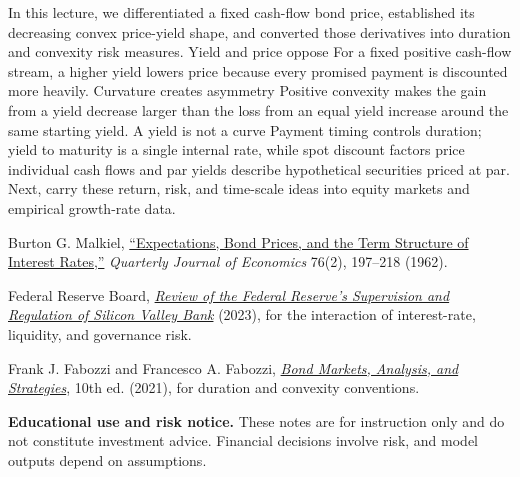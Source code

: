 \documentclass[11pt]{article}
\begin{document}
\keytakeaways
  {In this lecture, we differentiated a fixed cash-flow bond price, established its decreasing convex price-yield shape, and converted those derivatives into duration and convexity risk measures.}
  {Yield and price oppose}
  {For a fixed positive cash-flow stream, a higher yield lowers price because every promised payment is discounted more heavily.}
  {Curvature creates asymmetry}
  {Positive convexity makes the gain from a yield decrease larger than the loss from an equal yield increase around the same starting yield.}
  {A yield is not a curve}
  {Payment timing controls duration; yield to maturity is a single internal rate, while spot discount factors price individual cash flows and par yields describe hypothetical securities priced at par.}
  {Next, carry these return, risk, and time-scale ideas into equity markets and empirical growth-rate data.}

\begin{readinglist}
  \item Burton G. Malkiel, \href{https://academic.oup.com/qje/article-abstract/76/2/197/1904062}{``Expectations, Bond Prices, and the Term Structure of Interest Rates,''} \emph{Quarterly Journal of Economics} 76(2), 197--218 (1962).
  \item Federal Reserve Board, \href{https://www.federalreserve.gov/publications/2023-April-SVB-Key-Takeaways.htm}{\emph{Review of the Federal Reserve's Supervision and Regulation of Silicon Valley Bank}} (2023), for the interaction of interest-rate, liquidity, and governance risk.
  \item Frank J. Fabozzi and Francesco A. Fabozzi, \href{https://mitpress.mit.edu/9780262046275/bond-markets-analysis-and-strategies/}{\emph{Bond Markets, Analysis, and Strategies}}, 10th ed. (2021), for duration and convexity conventions.
\end{readinglist}

\vfill
{\sffamily\footnotesize\color{vnmuted}\textbf{Educational use and risk notice.} These notes are for instruction only and do not constitute investment advice. Financial decisions involve risk, and model outputs depend on assumptions.}
\end{document}
